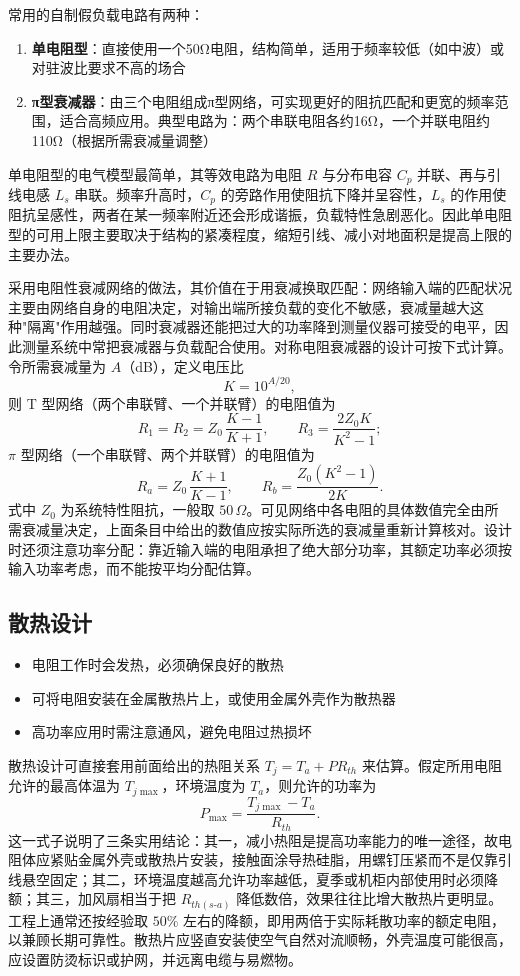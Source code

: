 常用的自制假负载电路有两种：

\begin{enumerate}
    \item \textbf{单电阻型}：直接使用一个50Ω电阻，结构简单，适用于频率较低（如中波）或对驻波比要求不高的场合
    
    \item \textbf{π型衰减器}：由三个电阻组成π型网络，可实现更好的阻抗匹配和更宽的频率范围，适合高频应用。典型电路为：两个串联电阻各约16Ω，一个并联电阻约110Ω（根据所需衰减量调整）
\end{enumerate}

单电阻型的电气模型最简单，其等效电路为电阻 $R$ 与分布电容 $C_p$ 并联、再与引线电感 $L_s$ 串联。频率升高时，$C_p$ 的旁路作用使阻抗下降并呈容性，$L_s$ 的作用使阻抗呈感性，两者在某一频率附近还会形成谐振，负载特性急剧恶化。因此单电阻型的可用上限主要取决于结构的紧凑程度，缩短引线、减小对地面积是提高上限的主要办法。

采用电阻性衰减网络的做法，其价值在于用衰减换取匹配：网络输入端的匹配状况主要由网络自身的电阻决定，对输出端所接负载的变化不敏感，衰减量越大这种"隔离"作用越强。同时衰减器还能把过大的功率降到测量仪器可接受的电平，因此测量系统中常把衰减器与负载配合使用。对称电阻衰减器的设计可按下式计算。令所需衰减量为 $A$（dB），定义电压比
\[
K = 10^{A/20},
\]
则 T 型网络（两个串联臂、一个并联臂）的电阻值为
\[
R_1 = R_2 = Z_0\,\frac{K-1}{K+1}, \qquad R_3 = \frac{2 Z_0 K}{K^2 - 1};
\]
$\pi$ 型网络（一个串联臂、两个并联臂）的电阻值为
\[
R_a = Z_0\,\frac{K+1}{K-1}, \qquad R_b = \frac{Z_0 (K^2 - 1)}{2K}.
\]
式中 $Z_0$ 为系统特性阻抗，一般取 $50\,\Omega$。可见网络中各电阻的具体数值完全由所需衰减量决定，上面条目中给出的数值应按实际所选的衰减量重新计算核对。设计时还须注意功率分配：靠近输入端的电阻承担了绝大部分功率，其额定功率必须按输入功率考虑，而不能按平均分配估算。

\subsection{散热设计}

\begin{itemize}
    \item 电阻工作时会发热，必须确保良好的散热
    \item 可将电阻安装在金属散热片上，或使用金属外壳作为散热器
    \item 高功率应用时需注意通风，避免电阻过热损坏
\end{itemize}

散热设计可直接套用前面给出的热阻关系 $T_j = T_a + P R_{th}$ 来估算。假定所用电阻允许的最高体温为 $T_{j\max}$，环境温度为 $T_a$，则允许的功率为
\[
P_{\max} = \frac{T_{j\max} - T_a}{R_{th}} .
\]
这一式子说明了三条实用结论：其一，减小热阻是提高功率能力的唯一途径，故电阻体应紧贴金属外壳或散热片安装，接触面涂导热硅脂，用螺钉压紧而不是仅靠引线悬空固定；其二，环境温度越高允许功率越低，夏季或机柜内部使用时必须降额；其三，加风扇相当于把 $R_{th(s\text{-}a)}$ 降低数倍，效果往往比增大散热片更明显。工程上通常还按经验取 $50\%$ 左右的降额，即用两倍于实际耗散功率的额定电阻，以兼顾长期可靠性。散热片应竖直安装使空气自然对流顺畅，外壳温度可能很高，应设置防烫标识或护网，并远离电缆与易燃物。

